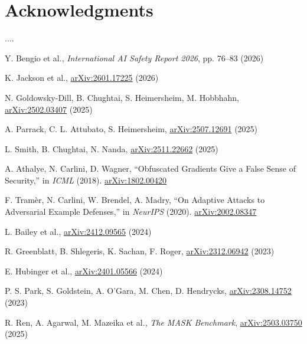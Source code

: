 \documentclass{webofc}
\begin{document}
\section{Acknowledgments}
....
%
% 
%
%
\begin{thebibliography}{}
%
Y. Bengio et al., \textit{International AI Safety Report 2026}, pp. 76--83 (2026)

K. Jackson et al., \href{https://arxiv.org/abs/2601.17225}{arXiv:2601.17225} (2026)

N. Goldowsky-Dill, B. Chughtai, S. Heimersheim, M. Hobbhahn, \href{https://arxiv.org/abs/2502.03407}{arXiv:2502.03407} (2025)

A. Parrack, C. L. Attubato, S. Heimersheim, \href{https://arxiv.org/abs/2507.12691}{arXiv:2507.12691} (2025)

L. Smith, B. Chughtai, N. Nanda, \href{https://arxiv.org/abs/2511.22662}{arXiv:2511.22662} (2025)

A. Athalye, N. Carlini, D. Wagner, ``Obfuscated Gradients Give a False Sense of Security,'' in \textit{ICML} (2018). \href{https://arxiv.org/abs/1802.00420}{arXiv:1802.00420}

F. Tram\`er, N. Carlini, W. Brendel, A. Madry, ``On Adaptive Attacks to Adversarial Example Defenses,'' in \textit{NeurIPS} (2020). \href{https://arxiv.org/abs/2002.08347}{arXiv:2002.08347}

L. Bailey et al., \href{https://arxiv.org/abs/2412.09565}{arXiv:2412.09565} (2024)

R. Greenblatt, B. Shlegeris, K. Sachan, F. Roger, \href{https://arxiv.org/abs/2312.06942}{arXiv:2312.06942} (2023)

E. Hubinger et al., \href{https://arxiv.org/abs/2401.05566}{arXiv:2401.05566} (2024)

P. S. Park, S. Goldstein, A. O'Gara, M. Chen, D. Hendrycks, \href{https://arxiv.org/abs/2308.14752}{arXiv:2308.14752} (2023)

R. Ren, A. Agarwal, M. Mazeika et al., \textit{The MASK Benchmark}, \href{https://arxiv.org/abs/2503.03750}{arXiv:2503.03750} (2025)


\end{thebibliography}
\end{document}
